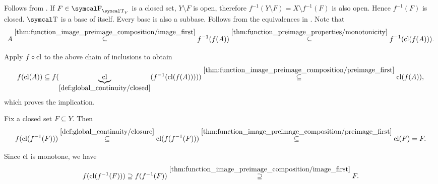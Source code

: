 \begin{RefListProof}
     Follows from .
     If \( F \in \CF_{\CT_Y} \) is a closed set, \( Y \setminus F \) is open, therefore \( f^{-1}(Y \setminus F) = X \setminus f^{-1}(F) \) is also open. Hence \( f^{-1}(F) \) is closed.
     \( \CT \) is a base of itself.
     Every base is also a subbase.
     Follows from the equivalences in .
     Note that
    \begin{equation*}
      A
      \overset {\ref{thm:function_image_preimage_composition/image_first}} \subseteq
      f^{-1}(f(A))
      \overset {\ref{thm:function_preimage_properties/monotonicity}} \subseteq
      f^{-1}(\operatorname{cl}(f(A))).
    \end{equation*}

    Apply \( f \circ \operatorname{cl} \) to the above chain of inclusions to obtain
    \begin{equation*}
      f(\operatorname{cl}(A))
      \subseteq
      f(\underbrace{\operatorname{cl}}_{\ref{def:global_continuity/closed}}(f^{-1}(\operatorname{cl}(f(A)))))
      \overset {\ref{thm:function_image_preimage_composition/preimage_first}} \subseteq
      \operatorname{cl}(f(A)),
    \end{equation*}
    which proves the implication.

     Fix a closed set \( F \subseteq Y \). Then
    \begin{equation}\label{def:global_continuity/closure_implies_closed_right}
      f(\operatorname{cl}(f^{-1}(F)))
      \overset {\ref{def:global_continuity/closure}} \subseteq
      \operatorname{cl}(f(f^{-1}(F)))
      \overset {\ref{thm:function_image_preimage_composition/preimage_first}} \subseteq
      \operatorname{cl}(F)
      =
      F.
    \end{equation}

    Since \( \operatorname{cl} \) is monotone, we have
    \begin{equation}\label{def:global_continuity/closure_implies_closed_left}
      f(\operatorname{cl}(f^{-1}(F)))
      \supseteq
      f(f^{-1}(F))
      \overset {\ref{thm:function_image_preimage_composition/image_first}} \supseteq
      F.
    \end{equation}


\end{RefListProof}
